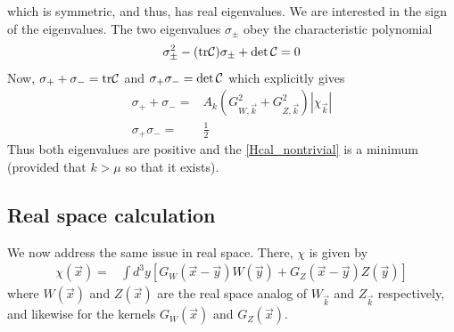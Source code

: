 \documentclass[twocolumn,prd,preprintnumbers,amsmath,amssymb,nofootinbib,superscriptaddress]{revtex4-1}
\newcommand{\lambdas}{\lambda_s}
\newcommand{\Mcal}{{\cal M}}
\newcommand{\Ccal}{{\cal C}}
\newcommand{\KB}{\ensuremath{K_{{\rm B}}}}
\begin{document}
which is symmetric, and thus, has real eigenvalues. We are interested in the sign of the eigenvalues. The two eigenvalues $\sigma_{\pm}$ obey the characteristic polynomial
\begin{align}
\sigma_{\pm}^2 - ({\rm tr} \Ccal) \sigma_{\pm} + \det\Ccal = 0
\end{align}
Now, $\sigma_+ + \sigma_- =  {\rm tr} \Ccal$ and $\sigma_+ \sigma_- = \det\Ccal $ which explicitly gives
\begin{align}
\sigma_+ + \sigma_- =&  A_k  \left(G_{W,\vec{k}}^2  +  G_{Z,\vec{k}}^2 \right) |\chi_{\vec{k}}| %
\\
\sigma_+  \sigma_- =&   \frac{1}{2} %
\end{align}
Thus both eigenvalues are positive and the \eqref{Hcal_nontrivial} is a minimum (provided that $k>\mu$ so that it exists).


\subsection{Real space calculation}
We now address the same issue in real space. There,
 $\chi$ is given by
\begin{align}
\chi(\vec{x}) =& \int d^3y \left[  G_W(\vec{x}-\vec{y})W(\vec{y}) +  G_Z(\vec{x}-\vec{y})Z(\vec{y}) \right]
\end{align}
where $W(\vec{x})$ and $Z(\vec{x})$ are the real space analog of $W_{\vec{k}} $ and $Z_{\vec{k}} $ respectively, and likewise for the kernels $G_W(\vec{x})$ and $G_Z(\vec{x})$.
\end{document}
